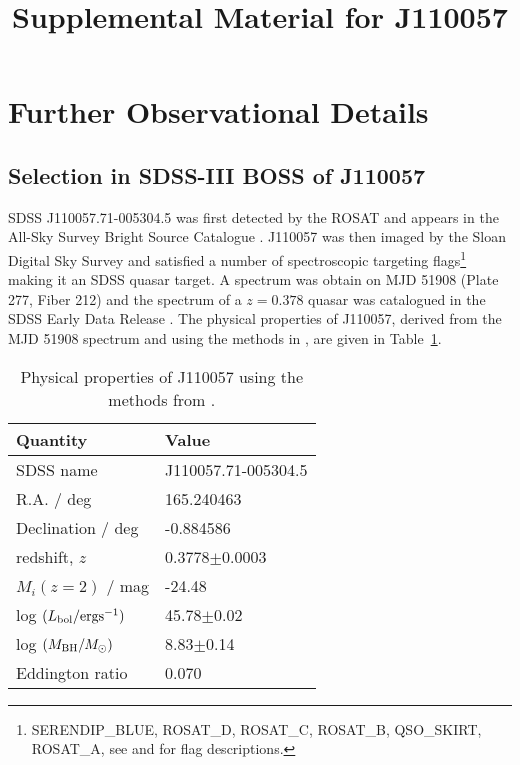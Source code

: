 \documentclass[11pt,a4paper]{article}
\begin{document}
   \title{Supplemental Material for J110057}
\maketitle


\section*{Further Observational Details}

\subsection*{Selection in SDSS-III BOSS of J110057}
SDSS J110057.71-005304.5 was first detected by the ROSAT
and appears in the All-Sky Survey Bright Source Catalogue
\citep[RASS-BSC; ][]{Appenzeller1998, Voges1999}. 
J110057 was then imaged by the Sloan Digital Sky
Survey and satisfied a number
of spectroscopic targeting flags\footnote{SERENDIP\_BLUE, ROSAT\_D,
ROSAT\_C, ROSAT\_B, QSO\_SKIRT, ROSAT\_A, see \citet{EDR} and
\citet{Richards2002} for flag descriptions.}  making it an SDSS quasar
target. A spectrum was obtain on MJD 51908 (Plate 277, Fiber 212)
and the spectrum of a $z=0.378$ quasar was catalogued in the
SDSS Early Data Release \citep{Schneider2002}. The physical properties
of J110057, derived from the MJD 51908 spectrum and using the methods
in \citet{Shen2011}, are given in Table~\ref{tab:Shen_props}.

\begin{table}[]
    \centering
    \begin{tabular}{l l }
      \hline \hline 
      Quantity                                         &  Value \\
      \hline 
      SDSS name                                     &   J110057.71-005304.5 \\
      R.A. / deg                &  165.240463 \\
      Declination / deg    &   -0.884586 \\ 
      redshift, $z$                                    &   0.3778$\pm$0.0003  \\
      $M_{i}(z=2)$  / mag                          &   -24.48  \\
      log $(L_{\rm bol} / {\rm erg s}^{-1}) $  &  45.78$\pm$0.02 \\
      log $(M_{\rm BH} / M_{\odot})  $           &  8.83$\pm$0.14 \\
      Eddington ratio                                &        0.070 \\
      \hline \hline 
    \end{tabular}
    \caption{Physical properties of J110057 using the methods from 
      \citet{Shen2011}.} 
    \label{tab:Shen_props}
\end{table}
\end{document}
